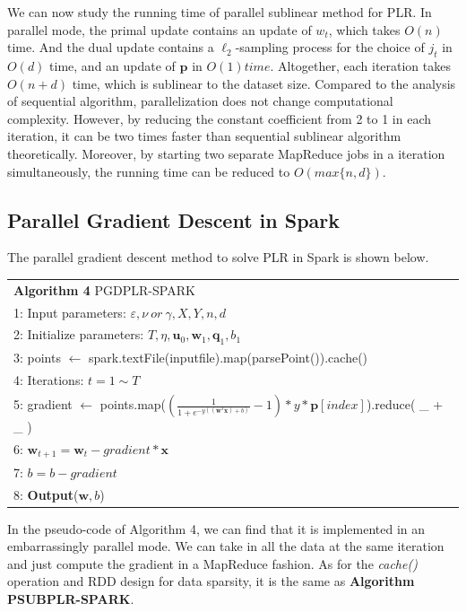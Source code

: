 \documentclass{llncs}
\newcommand{\bw}{\mathbf{w}}
\newcommand{\bp}{\mathbf{p}}
\newcommand{\bq}{\mathbf{q}}
\newcommand{\tspace}{\hspace*{2em}}
\begin{document}
We can now study the running time of parallel sublinear method for PLR.
In parallel mode, the primal update contains an update of $w_t$, which takes $O(n)$ time.
And the dual update contains a $\ell_2$-sampling process for the choice of $j_t$ in $O(d)$ time, and an update of $\bp$ in $O(1) time$.
Altogether, each iteration takes $O(n+d)$ time, which is sublinear to the dataset size.
Compared to the analysis of sequential algorithm, parallelization does not change computational complexity.
However, by reducing the constant coefficient from 2 to 1 in each iteration, it can be two times faster than sequential sublinear algorithm theoretically.
Moreover, by starting two separate MapReduce jobs in a iteration simultaneously, the running time can be reduced to $O(max\{n,d\})$.

\subsection{Parallel Gradient Descent in Spark}
The parallel gradient descent method to solve PLR in Spark is shown below.
    \begin{table}[ht]
	\begin{tabular}{l}
    \hline\noalign{\smallskip}
	\textbf{Algorithm 4} PGDPLR-SPARK \\
	\noalign{\smallskip}
	\hline
	\noalign{\smallskip}
    1:  Input parameters: $\varepsilon, \nu~or~\gamma, X, Y, n, d$ \\
    2:	Initialize parameters: $T, \eta, {\mathbf{u}}_{0}, {\bw}_{1}, {\mathbf{\bq}}_{1}, {b}_{1}$\\
    3:  points $\leftarrow$ spark.textFile(inputfile).map(parsePoint()).cache() \\
    4:  Iterations: $t=1 \sim T$ \\
    5:  \tspace gradient $\leftarrow$ points.map($(\frac{1}{1+e^{-y((\bw^T \textbf{x})+b)}}-1) * y * \bp [index]$).reduce( \_ + \_ ) \\
    6:  \tspace $\bw_{t+1} = \bw_t - gradient * \textbf{x}$ \\
    7:  \tspace $b = b - gradient$ \\
    8:  \textbf{Output}($\bw, b$) \\
    \hline
    \end{tabular}
	\end{table}

In the pseudo-code of Algorithm 4, we can find that it is implemented in an embarrassingly parallel mode.
We can take in all the data at the same iteration and just compute the gradient in a MapReduce fashion.
As for the \textit{cache()} operation and RDD design for data sparsity, it is the same as \textbf{Algorithm PSUBPLR-SPARK}.
\end{document}
